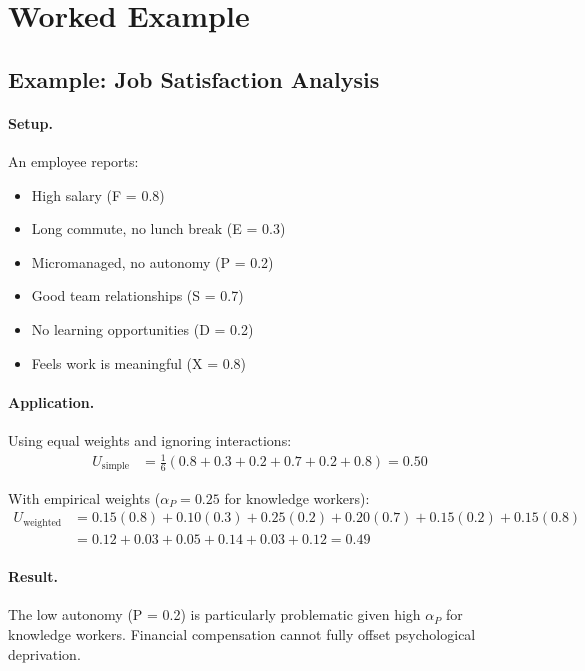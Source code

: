\section{Worked Example}
\label{sec:what-example}

\subsection{Example: Job Satisfaction Analysis}

\paragraph{Setup.}
An employee reports:
\begin{itemize}
\item High salary (F = 0.8)
\item Long commute, no lunch break (E = 0.3)
\item Micromanaged, no autonomy (P = 0.2)
\item Good team relationships (S = 0.7)
\item No learning opportunities (D = 0.2)
\item Feels work is meaningful (X = 0.8)
\end{itemize}

\paragraph{Application.}
Using equal weights and ignoring interactions:
\begin{align}
U_{\text{simple}} &= \frac{1}{6}(0.8 + 0.3 + 0.2 + 0.7 + 0.2 + 0.8) = 0.50
\end{align}

With empirical weights ($\alpha_P = 0.25$ for knowledge workers):
\begin{align}
U_{\text{weighted}} &= 0.15(0.8) + 0.10(0.3) + 0.25(0.2) + 0.20(0.7) + 0.15(0.2) + 0.15(0.8) \\
&= 0.12 + 0.03 + 0.05 + 0.14 + 0.03 + 0.12 = 0.49
\end{align}

\paragraph{Result.}
The low autonomy (P = 0.2) is particularly problematic given high $\alpha_P$
for knowledge workers. Financial compensation cannot fully offset psychological
deprivation.

